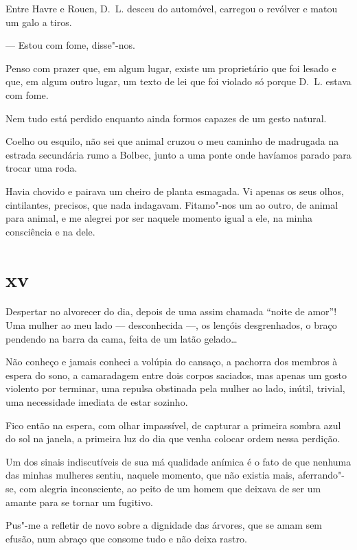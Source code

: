 \asterisc

Entre Havre e Rouen, D.~L. desceu do automóvel, carregou o revólver e
matou um galo a tiros.

--- Estou com fome, disse"-nos.

Penso com prazer que, em algum lugar, existe um proprietário que foi
lesado e que, em algum outro lugar, um texto de lei que foi violado só
porque D.~L. estava com fome.

Nem tudo está perdido enquanto ainda formos capazes de um gesto natural.

\asterisc

Coelho ou esquilo, não sei que animal cruzou o meu caminho de
madrugada na estrada secundária rumo a Bolbec, junto a uma ponte onde
havíamos parado para trocar uma roda.

Havia chovido e pairava um cheiro de planta esmagada. Vi apenas os seus
olhos, cintilantes, precisos, que nada indagavam. Fitamo"-nos um ao
outro, de animal para animal, e me alegrei por ser naquele momento
igual a ele, na minha consciência e na dele.

\section{xv}

Despertar no alvorecer do dia, depois de uma assim chamada ``noite de
amor''! Uma mulher ao meu lado --- desconhecida ---, os lençóis
desgrenhados, o braço pendendo na barra da cama, feita de um latão
gelado\ldots{}

Não conheço e jamais conheci a volúpia do cansaço, a pachorra dos
membros à espera do sono, a camaradagem entre dois corpos saciados, mas
apenas um gosto violento por terminar, uma repulsa obstinada pela mulher
ao lado, inútil, trivial, uma necessidade imediata de estar sozinho.

Fico então na espera, com olhar impassível, de capturar a primeira
sombra azul do sol na janela, a primeira luz do dia que venha colocar
ordem nessa perdição.

Um dos sinais indiscutíveis de sua má qualidade anímica é o fato de que
nenhuma das minhas mulheres sentiu, naquele momento, que não existia
mais, aferrando"-se, com alegria inconsciente, ao peito de um homem que
deixava de ser um amante para se tornar um fugitivo.

Pus"-me a refletir de novo sobre a dignidade das árvores, que se amam sem
efusão, num abraço que consome tudo e não deixa rastro.

